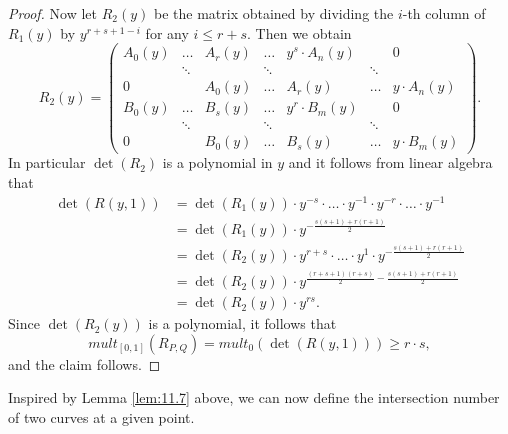 \documentclass{article}
\newcommand{\rb}[1]{\left( #1 \right)}
\renewcommand{\sb}[1]{\left[ #1 \right]}
\theoremstyle{definition}\newtheorem{definition}{Definition}[section]
\theoremstyle{definition}\newtheorem{notation}[definition]{Notation}
\theoremstyle{definition}\newtheorem{remark}[definition]{Remark}
\theoremstyle{definition}\newtheorem{example}[definition]{Example}
\theoremstyle{definition}\newtheorem{fact}{Fact}
\theoremstyle{definition}\newtheorem{exercise}{Exercise}
\begin{document}
\begin{proof}
Now let $ R_2\rb{y} $ be the matrix obtained by dividing the $ i $-th column of $ R_1\rb{y} $ by $ y^{r + s + 1 - i} $ for any $ i \le r + s $. Then we obtain
$$ R_2\rb{y} = \begin{pmatrix} A_0\rb{y} & \dots & A_r\rb{y} & \dots & y^s \cdot A_n\rb{y} & & 0 \\ & \ddots & & \ddots & & \ddots & \\ 0 & & A_0\rb{y} & \dots & A_r\rb{y} & \dots & y \cdot A_n\rb{y} \\ B_0\rb{y} & \dots & B_s\rb{y} & \dots & y^r \cdot B_m\rb{y} & & 0 \\ & \ddots & & \ddots & & \ddots & \\ 0 & & B_0\rb{y} & \dots & B_s\rb{y} & \dots & y \cdot B_m\rb{y} \end{pmatrix}. $$
In particular $ \det\rb{R_2} $ is a polynomial in $ y $ and it follows from linear algebra that
\begin{align*}
\det\rb{R\rb{y, 1}}
& = \det\rb{R_1\rb{y}} \cdot y^{-s} \cdot \dots \cdot y^{-1} \cdot y^{-r} \cdot \dots \cdot y^{-1} \\
& = \det\rb{R_1\rb{y}} \cdot y^{-\tfrac{s\rb{s + 1}+r\rb{r + 1}}{2}} \\
& = \det\rb{R_2\rb{y}} \cdot y^{r + s} \cdot \dots \cdot y^1 \cdot y^{-\tfrac{s\rb{s + 1} + r\rb{r + 1}}{2}} \\
& = \det\rb{R_2\rb{y}} \cdot y^{\tfrac{\rb{r + s + 1}\rb{r + s}}{2} - \tfrac{s\rb{s + 1}+r\rb{r + 1}}{2}} \\
& = \det\rb{R_2\rb{y}} \cdot y^{rs}.
\end{align*}
Since $ \det\rb{R_2\rb{y}} $ is a polynomial, it follows that
$$ mult_{\sb{0, 1}}\rb{R_{P, Q}} = mult_0\rb{\det\rb{R\rb{y, 1}}} \ge r \cdot s, $$
and the claim follows.
\end{proof}

Inspired by Lemma \ref{lem:11.7} above, we can now define the intersection number of two curves at a given point.
\end{document}
